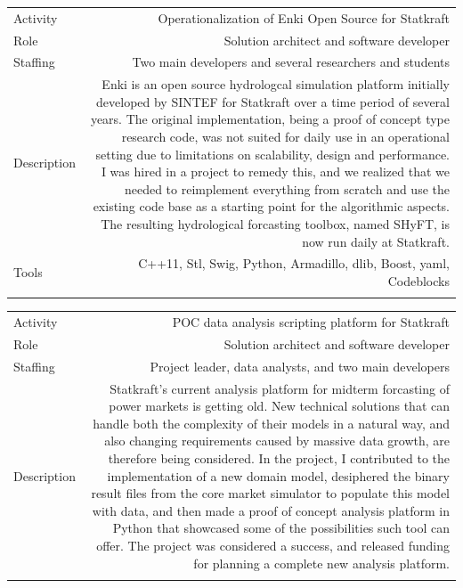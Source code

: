 \documentclass[english,a4paper,11pt]{article}
\begin{document}
\begin{tabular}{@{}LR}
Activity & Operationalization of Enki Open Source for Statkraft \\
Role & Solution architect and software developer \\
Staffing & Two main developers and several researchers and students \\
Description & Enki is an open source hydrologcal simulation platform initially developed by SINTEF for Statkraft over a time period of several years. The original implementation, being a proof of concept type research  code, was not suited for daily use in an operational setting due to limitations on scalability, design and performance. I was hired in a project to remedy this, and we realized that we needed to reimplement everything from scratch and use the existing code base as a starting point for the algorithmic aspects. The resulting hydrological forcasting toolbox, named SHyFT, is now run daily at Statkraft. \\
Tools & C++11, Stl, Swig, Python, Armadillo, dlib, Boost, yaml, Codeblocks \\ 
\addlinespace \bottomrule[.1pt] \addlinespace
   \end{tabular}

\begin{tabular}{@{}LR}
Activity & POC data analysis scripting platform for Statkraft \\
Role & Solution architect and software developer \\
Staffing & Project leader, data analysts, and two main developers \\
Description & Statkraft's current analysis platform for midterm forcasting of power markets is getting old. New technical solutions that can handle both the complexity of their models in a natural way, and also changing requirements caused by massive data growth, are therefore being considered. In the project, I contributed to the implementation of a new domain model, desiphered the binary result files from the core market simulator to populate this model with data, and then made a proof of concept analysis platform in Python that showcased some of the possibilities such tool can offer. The project was considered a success, and released funding for planning a complete new analysis platform. \\
\addlinespace \bottomrule[.1pt] \addlinespace
   \end{tabular}
\end{document}
